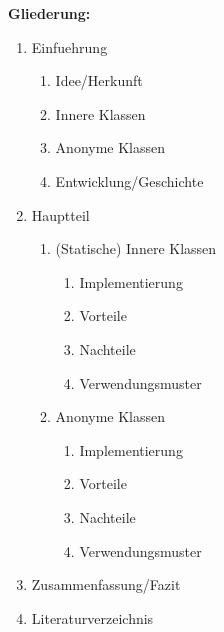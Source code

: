 \vspace*{2cm}
{\Large \textbf{Gliederung:}\\}

	\begin{enumerate}
		\item Einfuehrung
		\begin{enumerate}
			\item Idee/Herkunft
			\item Innere Klassen
			\item Anonyme Klassen
			\item Entwicklung/Geschichte
		\end{enumerate}
	\item Hauptteil
		\begin{enumerate}
			\item (Statische) Innere Klassen
			\begin{enumerate}
				\item Implementierung
				\item Vorteile
				\item Nachteile
				\item Verwendungsmuster
			\end{enumerate}
			\item Anonyme Klassen
			\begin{enumerate}
				\item Implementierung
				\item Vorteile
				\item Nachteile
				\item Verwendungsmuster
			\end{enumerate}
		\end{enumerate}
	\item Zusammenfassung/Fazit
	\item Literaturverzeichnis
	\end{enumerate}
\cleardoublepage
